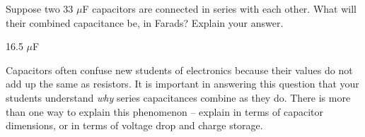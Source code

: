 

Suppose two 33 $\mu$F capacitors are connected in series with each other.  What will their combined capacitance be, in Farads?  Explain your answer.







16.5 $\mu$F







Capacitors often confuse new students of electronics because their values do not add up the same as resistors.  It is important in answering this question that your students understand {\it why} series capacitances combine as they do.  There is more than one way to explain this phenomenon -- explain in terms of capacitor dimensions, or in terms of voltage drop and charge storage.




